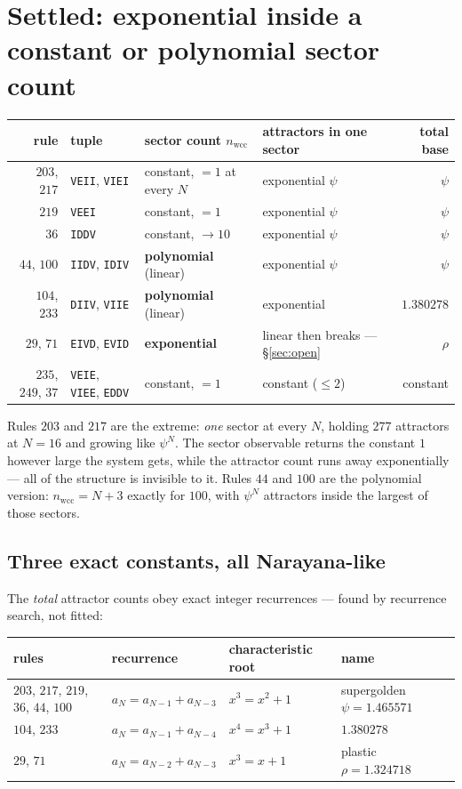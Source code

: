 \documentclass[11pt]{article}
\newcommand{\rt}[1]{\texttt{#1}}
\newcommand{\wcc}{\mathrm{wcc}}
\begin{document}
\section{Settled: exponential inside a constant or polynomial sector count}

\begin{center}\small
\begin{tabular}{rlllr}
\toprule
rule & tuple & sector count $n_\wcc$ & attractors in one sector & total base \\
\midrule
$203$, $217$ & \rt{VEII}, \rt{VIEI} & constant, $=1$ at every $N$ & exponential $\psi$ & $\psi$ \\
$219$ & \rt{VEEI} & constant, $=1$ & exponential $\psi$ & $\psi$ \\
$36$ & \rt{IDDV} & constant, $\to10$ & exponential $\psi$ & $\psi$ \\
$44$, $100$ & \rt{IIDV}, \rt{IDIV} & \textbf{polynomial} (linear) & exponential $\psi$ & $\psi$ \\
$104$, $233$ & \rt{DIIV}, \rt{VIIE} & \textbf{polynomial} (linear) & exponential & $1.380278$ \\
\midrule
$29$, $71$ & \rt{EIVD}, \rt{EVID} & \textbf{exponential} & linear then breaks --- \S\ref{sec:open} & $\rho$ \\
$235$, $249$, $37$ & \rt{VEIE}, \rt{VIEE}, \rt{EDDV} & constant, $=1$ & constant ($\le2$) & constant \\
\bottomrule
\end{tabular}
\end{center}

\noindent Rules $203$ and $217$ are the extreme: \emph{one} sector at every $N$,
holding $277$ attractors at $N=16$ and growing like $\psi^N$. The sector
observable returns the constant $1$ however large the system gets, while the
attractor count runs away exponentially --- all of the structure is invisible to
it. Rules $44$ and $100$ are the polynomial version: $n_\wcc=N+3$ exactly for
$100$, with $\psi^N$ attractors inside the largest of those sectors.

\subsection{Three exact constants, all Narayana-like}

The \emph{total} attractor counts obey exact integer recurrences --- found by
recurrence search, not fitted:

\begin{center}\small
\begin{tabular}{llll}
\toprule
rules & recurrence & characteristic root & name \\
\midrule
$203$, $217$, $219$, $36$, $44$, $100$ & $a_N=a_{N-1}+a_{N-3}$ & $x^3=x^2+1$ & supergolden $\psi=1.465571$ \\
$104$, $233$ & $a_N=a_{N-1}+a_{N-4}$ & $x^4=x^3+1$ & $1.380278$ \\
$29$, $71$ & $a_N=a_{N-2}+a_{N-3}$ & $x^3=x+1$ & plastic $\rho=1.324718$ \\
\bottomrule
\end{tabular}
\end{center}
\end{document}
